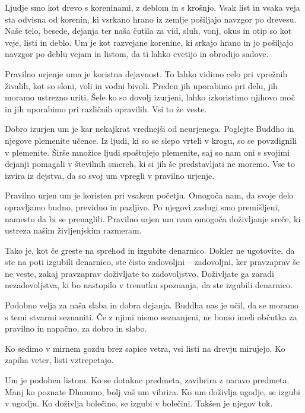 Ljudje smo kot drevo s koreninami, z deblom in s krošnjo. Vsak list in vsaka veja sta odvisna od korenin, ki vsrkano hrano iz zemlje pošiljajo navzgor po drevesu.
Naše telo, besede, dejanja ter naša čutila za vid, sluh, vonj, okus in otip so kot veje, listi in deblo. Um je kot razvejane korenine, ki srkajo hrano in jo pošiljajo navzgor po deblu vejam in listom, da ti lahko cvetijo in obrodijo sadove.

\clearpage

Pravilno urjenje uma je koristna dejavnost. To lahko vidimo celo pri vprežnih živalih, kot so sloni, voli in vodni bivoli. Preden jih uporabimo pri delu, jih moramo ustrezno uriti. Šele ko so dovolj izurjeni, lahko izkoristimo njihovo moč in jih uporabimo pri različnih opravilih. Vsi to že veste.

Dobro izurjen um je kar nekajkrat vrednejši od neurjenega. Poglejte Buddho in njegove plemenite učence. Iz ljudi, ki so se slepo vrteli v krogu, so se povzdignili v plemenite. Širše množice ljudi spoštujejo plemenite, saj so nam oni s svojimi dejanji pomagali v številnih smereh, ki si jih še predstavljati ne moremo. Vse to izvira iz dejstva, da so svoj um vpregli v pravilno urjenje.

Pravilno urjen um je koristen pri vsakem početju. Omogoča nam, da svoje delo opravljamo budno, previdno in pazljivo. Po njegovi zaslugi smo premišljeni, namesto da bi se prenaglili. Pravilno urjen um nam omogoča doživljanje sreče, ki ustreza našim življenjskim razmeram.

\clearpage


Tako je, kot če greste na sprehod in izgubite denarnico. Dokler ne ugotovite, da ste na poti izgubili denarnico, ste čisto zadovoljni – zadovoljni, ker pravzaprav še ne veste, zakaj pravzaprav doživljate to zadovoljstvo. Doživljate ga zaradi nezadovoljstva, ki bo nastopilo v trenutku spoznanja, da ste izgubili denarnico.

Podobno velja za naša slaba in dobra dejanja. Buddha nas je učil, da se moramo s temi stvarmi seznaniti. Če z njimi nismo seznanjeni, ne bomo imeli občutka za pravilno in napačno, za dobro in slabo.


Ko sedimo v mirnem gozdu brez sapice vetra, vsi listi na drevju mirujejo. Ko zapiha veter, listi vztrepetajo.

Um je podoben listom. Ko se dotakne predmeta, zavibrira z naravo predmeta. Manj ko poznate Dhammo, bolj vaš um vibrira. Ko um doživlja ugodje, se izgubi v ugodju. Ko doživlja bolečino, se izgubi v bolečini. Takšen je njegov tok.

